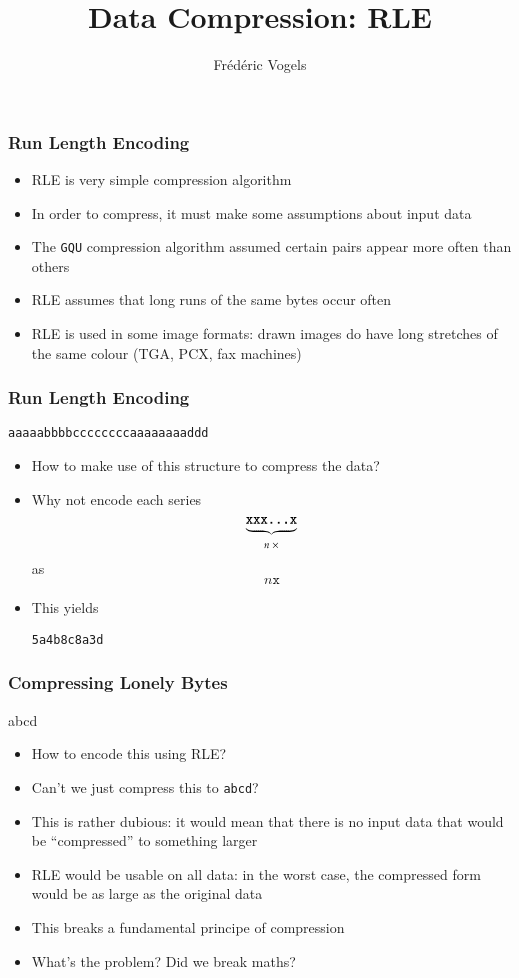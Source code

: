 \documentclass{../ucll-slides}
\title{Data Compression: RLE}
\author{Fr\'ed\'eric Vogels}
\begin{document}
\begin{frame}
  \titlepage
\end{frame}

\begin{frame}
  \frametitle{Run Length Encoding}
  \begin{itemize}
    \item RLE is very simple compression algorithm
    \item In order to compress, it must make some assumptions about input data
    \item The \texttt{GQU} compression algorithm assumed certain pairs appear more often than others
    \item RLE assumes that long runs of the same bytes occur often
    \item RLE is used in some image formats: drawn images do have long stretches of the same colour
          (TGA, PCX, fax machines)
  \end{itemize}
\end{frame}

\begin{frame}
  \frametitle{Run Length Encoding}
  \begin{center}
    \tt aaaaabbbbccccccccaaaaaaaaddd
  \end{center}
  \begin{itemize}
    \item How to make use of this structure to compress the data?
    \item Why not encode each series
         \[
           \underbrace{\texttt{xxx\dots x}}_{n \; \times}
         \]
         as
         \[
           n\texttt{x}
         \]
    \item This yields
          \begin{center}
            \tt 5a4b8c8a3d
          \end{center}
  \end{itemize}
\end{frame}

\begin{frame}
  \frametitle{Compressing Lonely Bytes}
  \begin{center}
    abcd
  \end{center}
  \begin{itemize}
    \item How to encode this using RLE?
    \item Can't we just compress this to \texttt{abcd}?
    \item This is rather dubious: it would mean that there is no input data
          that would be ``compressed'' to something larger
    \item RLE would be usable on all data: in the worst case, the compressed
          form would be as large as the original data
    \item This breaks a fundamental principe of compression
    \item What's the problem? Did we break maths?
  \end{itemize}
\end{frame}
\end{document}
